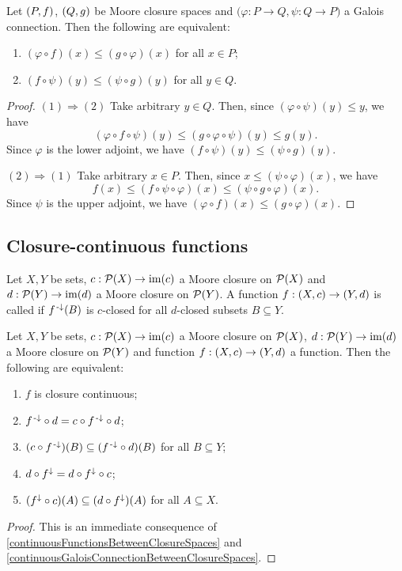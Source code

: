 \begin{lemma} \label{continuousGaloisConnectionBetweenClosureSpaces}
Let $\sSet{P,f}$, $\sSet{Q,g}$ be Moore closure spaces and $\big(\varphi: P\to Q, \psi: Q\to P\big)$ a Galois connection. Then the following are equivalent:
\begin{enumerate}
\item $(\varphi \circ f)(x) \leq (g\circ \varphi)(x)$ for all $x\in P$;
\item $(f\circ \psi)(y) \leq (\psi \circ g)(y)$ for all $y\in Q$.
\end{enumerate}
\end{lemma}
\begin{proof}
$(1) \Rightarrow (2)$ Take arbitrary $y\in Q$. Then, since $(\varphi\circ \psi)(y) \leq y$, we have
\[ (\varphi \circ f \circ \psi)(y) \leq (g\circ \varphi \circ \psi)(y) \leq g(y). \]
Since $\varphi$ is the lower adjoint, we have $(f\circ \psi)(y) \leq (\psi\circ g)(y)$.

$(2) \Rightarrow (1)$ Take arbitrary $x\in P$. Then, since $x \leq (\psi\circ \varphi)(x)$, we have
\[ f(x) \leq (f\circ\psi\circ \varphi)(x) \leq (\psi \circ g\circ \varphi)(x). \]
Since $\psi$ is the upper adjoint, we have $(\varphi \circ f)(x) \leq (g\circ \varphi)(x)$.
\end{proof}

\subsection{Closure-continuous functions}
\begin{definition}
Let $X,Y$ be sets, $c: \operatorname{\mathcal{P}}(X)\to \operatorname{im}(c)$ a Moore closure on $\operatorname{\mathcal{P}}(X)$ and $d: \operatorname{\mathcal{P}}(Y)\to \operatorname{im}(d)$ a Moore closure on $\operatorname{\mathcal{P}}(Y)$. A function $f: \sSet{X, c}\to \sSet{Y, d}$ is called  if $f^{\text{\hspace{0.15em}-}\downarrow}(B)$ is $c$-closed for all $d$-closed subsets $B\subseteq Y$.
\end{definition}

\begin{lemma} \label{closureContinuousEquivalents}
Let $X,Y$ be sets, $c: \operatorname{\mathcal{P}}(X)\to \operatorname{im}(c)$ a Moore closure on $\operatorname{\mathcal{P}}(X)$, $d: \operatorname{\mathcal{P}}(Y)\to \operatorname{im}(d)$ a Moore closure on $\operatorname{\mathcal{P}}(Y)$ and function $f: \sSet{X, c}\to \sSet{Y, d}$ a function. Then the following are equivalent:
\begin{enumerate}
\item $f$ is closure continuous;
\item $f^{\text{\hspace{0.15em}-}\downarrow}\circ d = c\circ f^{\text{\hspace{0.15em}-}\downarrow}\circ d$;
\item $(c\circ f^{\text{\hspace{0.15em}-}\downarrow})(B) \subseteq (f^{\text{\hspace{0.15em}-}\downarrow} \circ d)(B)$ for all $B\subseteq Y$;
\item $d\circ f^\downarrow = d\circ f^\downarrow\circ c$;
\item $(f^\downarrow\circ c)(A) \subseteq (d\circ f^\downarrow)(A)$ for all $A\subseteq X$.
\end{enumerate}
\end{lemma}
\begin{proof}
This is an immediate consequence of \ref{continuousFunctionsBetweenClosureSpaces} and \ref{continuousGaloisConnectionBetweenClosureSpaces}.
\end{proof}

